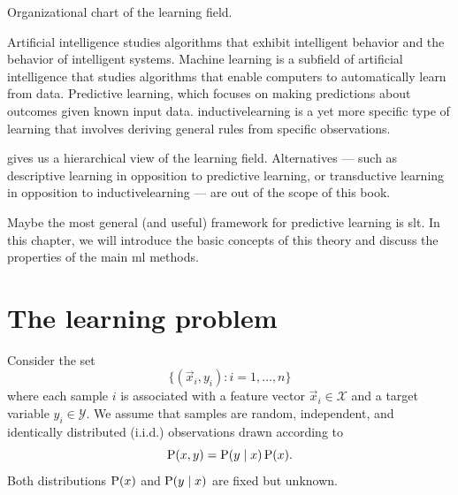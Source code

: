 \begin{figurebox}[label=fig:learning]{Organizational chart of the learning field.}
  \centering
  \tcblower
  Artificial intelligence studies algorithms that exhibit intelligent behavior and the
  behavior of intelligent systems.  Machine learning is a subfield of artificial
  intelligence that studies algorithms that enable computers to automatically learn from
  data.  Predictive learning, which focuses on making predictions about outcomes given
  known input data.  \Gls{inductivelearning} is a yet more specific type of learning that
  involves deriving general rules from specific observations.
\end{figurebox}

 gives us a hierarchical view of the learning field.  Alternatives ---
such as descriptive learning in opposition to predictive learning, or transductive
learning in opposition to \gls{inductivelearning} --- are out of the scope of this book.

Maybe the most general (and useful) framework for predictive learning is \gls{slt}.
In this chapter, we will introduce the basic concepts of this theory and discuss the
properties of the main \gls{ml} methods.

\section{The learning problem}
\label{sec:learning-problem}

Consider the set
\begin{equation}
  \label{eq:training-set}
  \big\{(\vec{x}_i, y_i) : i = 1, \dots, n \big\}
\end{equation}
where each sample $i$ is associated with a feature vector $\vec{x}_i \in \mathcal{X}$ and a target variable
$y_i \in \mathcal{Y}$.  We assume that samples are random, independent, and identically
distributed (i.i.d.) observations drawn according to $$\operatorname{P}(x, y) = \operatorname{P}(y \mid x) \operatorname{P}(x)\text{.}$$
Both distributions $\operatorname{P}(x)$ and $\operatorname{P}(y \mid x)$ are fixed but unknown.

